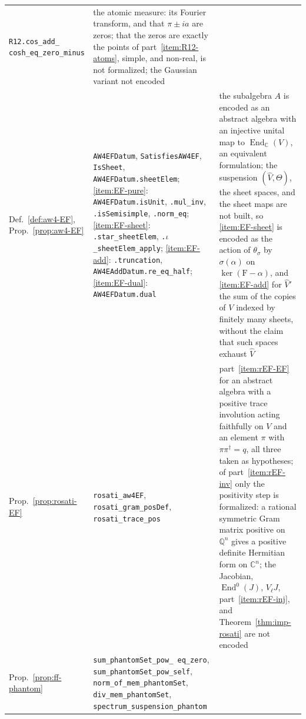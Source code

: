 \documentclass[11pt]{amsart}
\theoremstyle{plain}
\theoremstyle{definition}
\theoremstyle{remark}
\numberwithin{equation}{section}
\newcommand{\C}{\mathbb{C}}
\newcommand{\Q}{\mathbb{Q}}
\begin{document}
{\begin{longtable}{@{}>{\raggedright\arraybackslash}p{}
>{\raggedright\arraybackslash}p{}
>{\raggedright\arraybackslash}p{}@{}}
\texttt{R12.\allowbreak{}cos\_\allowbreak{}add\_\allowbreak{}%
cosh\_\allowbreak{}eq\_\allowbreak{}zero\_\allowbreak{}minus} &
the atomic measure: its Fourier transform, and that $\pi\pm ia$ are
zeros; that the zeros are exactly the points of
part~\ref{item:R12-atoms}, simple, and non-real, is not formalized; the
Gaussian variant not encoded\\
Def.~\ref{def:aw4-EF}, Prop.~\ref{prop:aw4-EF} &
\texttt{AW4EFDatum}, \texttt{SatisfiesAW4EF}, \texttt{IsSheet},
\texttt{AW4EFDatum.\allowbreak{}sheetElem};
\ref{item:EF-pure}: \texttt{AW4EFDatum.\allowbreak{}isUnit},
\texttt{.mul\_\allowbreak{}inv}, \texttt{.isSemisimple},
\texttt{.norm\_\allowbreak{}eq};
\ref{item:EF-sheet}: \texttt{.star\_\allowbreak{}sheetElem},
\texttt{.}$\iota$\texttt{\_\allowbreak{}sheetElem\_\allowbreak{}apply};
\ref{item:EF-add}: \texttt{.truncation},
\texttt{AW4EAddDatum.\allowbreak{}re\_\allowbreak{}eq\_\allowbreak{}half};
\ref{item:EF-dual}: \texttt{AW4EFDatum.\allowbreak{}dual} &
the subalgebra $A$ is encoded as an abstract algebra with an injective
unital map to $\operatorname{End}_\C(V)$, an equivalent formulation;
the suspension $(\widehat V,\Theta)$, the sheet spaces, and the sheet
maps are not built, so \ref{item:EF-sheet} is encoded as the action of
$\theta_\sigma$ by $\sigma(\alpha)$ on $\ker(\mathrm F-\alpha)$, and
\ref{item:EF-add} for $\widehat V'$ the sum of the copies of $V$
indexed by finitely many sheets, without the claim that such spaces
exhaust $\widehat V$\\
Prop.~\ref{prop:rosati-EF} &
\texttt{rosati\_\allowbreak{}aw4EF},
\texttt{rosati\_\allowbreak{}gram\_\allowbreak{}posDef},
\texttt{rosati\_\allowbreak{}trace\_\allowbreak{}pos} &
part~\ref{item:rEF-EF} for an abstract algebra with a positive trace
involution acting faithfully on $V$ and an element $\pi$ with
$\pi\pi^\dagger=q$, all three taken as hypotheses; of
part~\ref{item:rEF-inv} only the positivity step is formalized: a
rational symmetric Gram matrix positive on $\Q^n$ gives a positive
definite Hermitian form on $\C^n$; the Jacobian,
$\operatorname{End}^0(J)$, $V_\ell J$, part~\ref{item:rEF-inj}, and
Theorem~\ref{thm:imp-rosati} are not encoded\\
Prop.~\ref{prop:ff-phantom} &
\texttt{sum\_\allowbreak{}phantomSet\_\allowbreak{}pow\_\allowbreak{}%
eq\_\allowbreak{}zero},
\texttt{sum\_\allowbreak{}phantomSet\_\allowbreak{}pow\_\allowbreak{}self},
\texttt{norm\_\allowbreak{}of\_\allowbreak{}mem\_\allowbreak{}phantomSet},
\texttt{div\_\allowbreak{}mem\_\allowbreak{}phantomSet},
\texttt{spectrum\_\allowbreak{}suspension\_\allowbreak{}phantom} &

\end{longtable}}
\end{document}
